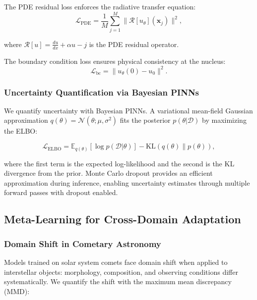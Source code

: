 \documentclass[preprint2]{aastex631}
\begin{document}
The PDE residual loss enforces the radiative transfer equation:
\begin{equation}\label{eq:pde_loss}
\mathcal{L}_{\text{PDE}} = \frac{1}{M} \sum_{j=1}^{M} \|\mathcal{R}[u_\theta](\mathbf{x}_j)\|^2,
\end{equation}

where $\mathcal{R}[u] = \frac{du}{dx} + \alpha u - j$ is the PDE residual operator.

The boundary condition loss ensures physical consistency at the nucleus:
\begin{equation}\label{eq:bc_loss}
\mathcal{L}_{\text{bc}} = \|u_\theta(0) - u_0\|^2.
\end{equation}

\subsubsection{Uncertainty Quantification via Bayesian PINNs}

We quantify uncertainty with Bayesian PINNs. A variational mean-field Gaussian approximation $q(\theta) = \mathcal{N}(\theta; \mu, \sigma^2)$ fits the posterior $p(\theta | \mathcal{D})$ by maximizing the ELBO:

\begin{equation}\label{eq:elbo}
\mathcal{L}_{\text{ELBO}} = \mathbb{E}_{q(\theta)}[\log p(\mathcal{D}|\theta)] - \text{KL}(q(\theta) \| p(\theta)),
\end{equation}

where the first term is the expected log-likelihood and the second is the KL divergence from the prior. Monte Carlo dropout \citep{gal16} provides an efficient approximation during inference, enabling uncertainty estimates through multiple forward passes with dropout enabled.

\subsection{Meta-Learning for Cross-Domain Adaptation}

\subsubsection{Domain Shift in Cometary Astronomy}

Models trained on solar system comets face domain shift when applied to interstellar objects: morphology, composition, and observing conditions differ systematically. We quantify the shift with the maximum mean discrepancy (MMD):
\end{document}

